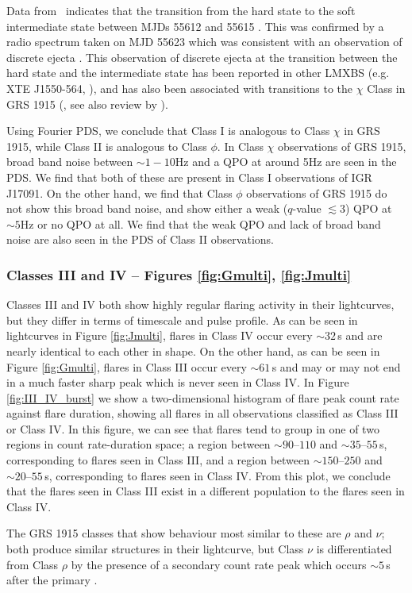 \par Data from \rxte\  indicates that the transition from the hard state to the soft intermediate state between MJDs 55612 and 55615 \citep{Drave_Return}.  This was confirmed by a radio spectrum taken on MJD 55623 which was consistent with an observation of discrete ejecta \citep{Rodriguez_D}.  This observation of discrete ejecta at the transition between the hard state and the intermediate state has been reported in other LMXBS (e.g. XTE J1550-564, \citealp{Rodriguez_XTE}), and has also been associated with transitions to the $\chi$ Class in GRS 1915 (\citealp{Rodriguez_Ejection}, see also review by \citealp{Fender_Jets}).

\par Using Fourier PDS, we conclude that Class I is analogous to Class $\chi$ in GRS 1915, while Class II is analogous to Class $\phi$.  In Class $\chi$ observations of GRS 1915, broad band noise between $\sim1-10$Hz and a QPO at around 5Hz are seen in the PDS.  We find that both of these are present in Class I observations of IGR J17091.  On the other hand, we find that Class $\phi$ observations of GRS 1915 do not show this broad band noise, and show either a weak ($q$-value $\lesssim 3$) QPO at $\sim5$Hz or no QPO at all.  We find that the weak QPO and lack of broad band noise are also seen in the PDS of Class II observations.

\subsubsection{Classes III and IV -- Figures \ref{fig:Gmulti}, \ref{fig:Jmulti}}

\par Classes III and IV both show highly regular flaring activity in their lightcurves, but they differ in terms of timescale and pulse profile.  As can be seen in lightcurves in Figure \ref{fig:Jmulti}, flares in Class IV occur every $\sim32$\,s and are nearly identical to each other in shape.  On the other hand, as can be seen in Figure \ref{fig:Gmulti}, flares in Class III occur every $\sim61$\,s and may or may not end in a much faster sharp peak which is never seen in Class IV.  In Figure \ref{fig:III_IV_burst} we show a two-dimensional histogram of flare peak count rate against flare duration, showing all flares in all observations classified as Class III or Class IV.  In this figure, we can see that flares tend to group in one of two regions in count rate-duration space; a region between $\sim90\mbox{--}110$ \spcu and $\sim35\mbox{--}55$\,s, corresponding to flares seen in Class III, and a region between $\sim150\mbox{--}250$ \spcu and $\sim20\mbox{--}55$\,s, corresponding to flares seen in Class IV.  From this plot, we conclude that the flares seen in Class III exist in a different population to the flares seen in Class IV.
\par The GRS 1915 classes that show behaviour most similar to these are $\rho$ and $\nu$; both produce similar structures in their lightcurve, but Class $\nu$ is differentiated from Class $\rho$ by the presence of a secondary count rate peak which occurs $\sim5$\,s after the primary \citep{Belloni_GRS_MI}.

